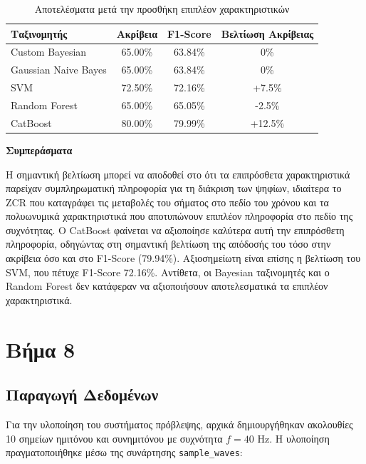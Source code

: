 \documentclass[a4paper,12pt]{article}
\begin{document}
\begin{table}[h]
    \centering
    \begin{tabular}{lccc}
        \hline
        \textbf{Ταξινομητής} & \textbf{Ακρίβεια} & \textbf{F1-Score} & \textbf{Βελτίωση Ακρίβειας} \\
        \hline
        Custom Bayesian      & 65.00\%           & 63.84\%           & 0\%                         \\
        Gaussian Naive Bayes & 65.00\%           & 63.84\%           & 0\%                         \\
        SVM                  & 72.50\%           & 72.16\%           & +7.5\%                      \\
        Random Forest        & 65.00\%           & 65.05\%           & -2.5\%                      \\
        CatBoost             & 80.00\%           & 79.99\%           & +12.5\%                     \\
        \hline
    \end{tabular}
    \caption{Αποτελέσματα μετά την προσθήκη επιπλέον χαρακτηριστικών}
\end{table}

\textbf{Συμπεράσματα}

Η σημαντική βελτίωση μπορεί να αποδοθεί στο ότι τα επιπρόσθετα χαρακτηριστικά παρείχαν
συμπληρωματική πληροφορία για τη διάκριση των ψηφίων, ιδιαίτερα το ZCR που καταγράφει
τις μεταβολές του σήματος στο πεδίο του χρόνου και τα πολυωνυμικά χαρακτηριστικά που
αποτυπώνουν επιπλέον πληροφορία στο πεδίο της συχνότητας. Ο CatBoost φαίνεται να
αξιοποίησε καλύτερα αυτή την επιπρόσθετη πληροφορία, οδηγώντας στη σημαντική βελτίωση
της απόδοσής του τόσο στην ακρίβεια όσο και στο F1-Score (79.94\%). Αξιοσημείωτη
είναι επίσης η βελτίωση του SVM, που πέτυχε F1-Score 72.16\%. Αντίθετα, οι Bayesian
ταξινομητές και ο Random Forest δεν κατάφεραν να αξιοποιήσουν αποτελεσματικά τα
επιπλέον χαρακτηριστικά.

\section*{Βήμα 8}

\subsection*{Παραγωγή Δεδομένων}

Για την υλοποίηση του συστήματος πρόβλεψης, αρχικά δημιουργήθηκαν ακολουθίες 10 σημείων ημιτόνου και συνημιτόνου με συχνότητα $f = 40$ Hz. Η υλοποίηση πραγματοποιήθηκε μέσω της συνάρτησης \texttt{sample\_waves}:
\end{document}
